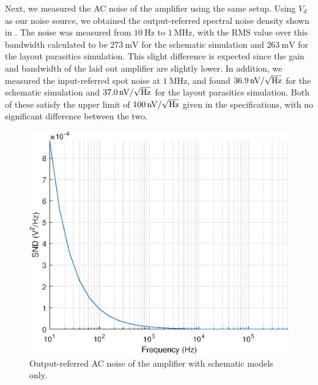 \documentclass[journal,hidelinks]{IEEEtran}
\begin{document}
Next, we measured the AC noise of the amplifier using the same setup. Using $V_d$ as our noise source, we obtained the output-referred spectral noise density shown in . The noise was measured from $\SI{10}{\hertz}$ to $\SI{1}{\mega\hertz}$, with the RMS value over this bandwidth calculated to be $\SI{273}{\milli\volt}$ for the schematic simulation and $\SI{263}{\milli\volt}$ for the layout parasitics simulation. This slight difference is expected since the gain and bandwidth of the laid out amplifier are slightly lower.
In addition, we measured the input-referred spot noise at $\SI{1}{\mega\hertz}$, and found $\SI{36.9}{\nano\volt\per\sqrt{\hertz}}$ for the schematic simulation and $\SI{37.0}{\nano\volt\per\sqrt{\hertz}}$ for the layout parasitics simulation. Both of these satisfy the upper limit of $\SI{100}{\nano\volt\per\sqrt{\hertz}}$ given in the specifications, with no significant difference between the two.

\begin{figure}[!htb]
  \centering
  \includegraphics[width=\columnwidth]{figures/schematic/ac_noise.eps}
  \caption{Output-referred AC noise of the amplifier with schematic models only.}
  \label{fig:sch_ac_noise}
\end{figure}
\end{document}

